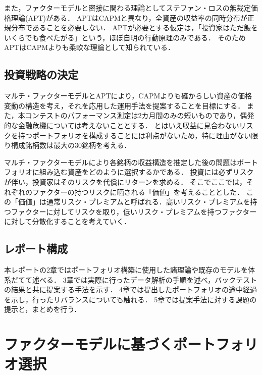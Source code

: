 ﻿\documentclass[a4paper]{jarticle}
\begin{document}
また，ファクターモデルと密接に関わる理論としてステファン・ロスの無裁定価格理論(APT)\cite{Ross}がある．
APTはCAPMと異なり，全資産の収益率の同時分布が正規分布であることを必要しない．
APTが必要とする仮定は，「投資家はただ飯をいくらでも食べたがる」という，ほぼ自明の行動原理のみである\cite{analyst}．
そのためAPTはCAPMよりも柔軟な理論として知られている．

\subsection{投資戦略の決定}

マルチ・ファクターモデルとAPTにより，CAPMよりも確からしい資産の価格変動の構造を考え，それを応用した運用手法を提案することを目標にする．
また，本コンテストのパフォーマンス測定は2カ月間のみの短いものであり，偶発的な金融危機については考えないこととする．
とはいえ収益に見合わないリスクを持つポートフォリオを構成することには利点がないため，特に理由がない限り構成銘柄数は最大の30銘柄を考える．

マルチ・ファクターモデルにより各銘柄の収益構造を推定した後の問題はポートフォリオに組み込む資産をどのように選択するかである．
投資には必ずリスクが伴い，投資家はそのリスクを代償にリターンを求める．
そこでここでは，それぞれのファクターの持つリスクに晒される「価値」を考えることとした．
この「価値」は通常リスク・プレミアムと呼ばれる．高いリスク・プレミアムを持つファクターに対してリスクを取り，低いリスク・プレミアムを持つファクターに対して分散化することを考えていく．

\subsection{レポート構成}
本レポートの2章ではポートフォリオ構築に使用した諸理論や既存のモデルを体系だてて述べる．
3章では実際に行ったデータ解析の手順を述べ，バックテストの結果と共に提案する手法を示す．
4章では提出したポートフォリオの途中経過を示し，行ったリバランスについても触れる．
5章では提案手法に対する課題の提示と，まとめを行う．










\section{ファクターモデルに基づくポートフォリオ選択}
\end{document}
